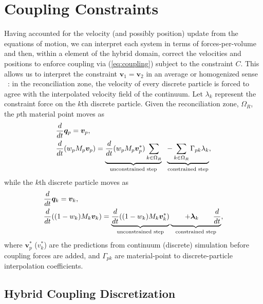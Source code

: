 \section{Coupling Constraints}
Having accounted for the velocity (and possibly position) update from the equations of motion, we can interpret each
system in terms of forces-per-volume and then, within a element of the hybrid domain, correct the velocities and positions to
enforce coupling via (\ref{eq:coupling}) subject to the constraint $C$. This allows us to interpret the constraint
$\bm{v}_1 = \bm{v}_2$ in an average or homogenized sense ~\cite{Bergou:2007:TTDTS}: in the reconciliation zone, 
the velocity of every discrete particle is forced to agree with the interpolated velocity field of the continuum. Let $\lambda_k$
represent the constraint force on the $k$th discrete particle. Given the reconciliation zone, $\Omega_R$, the $p$th
material point moves as
\begin{align}
\begin{aligned}
&\frac{d}{dt} \boldsymbol{q}_p = \bm{v}_p , \\
&\frac{d}{dt} (w_p M_p \bm{v}_p) = \underbrace{\frac{d}{dt} (w_p M_p \bm{v}_p^*) \sum_{k \in \Omega_R} }_{\textrm{\scriptsize unconstrained step}} \hspace{6pt} \underbrace{- \sum_{k \in \Omega_R} \Gamma_{pk}\lambda_k}_{\textrm{\scriptsize constrained step}} ,
\end{aligned}
\end{align}
while the $k$th discrete particle moves as
\begin{align}
\begin{aligned}
&\frac{d}{dt} \boldsymbol{q}_k = \bm{v}_k , \\
&\frac{d}{dt} ((1-w_k) M_k \bm{v}_k) = \underbrace{\frac{d}{dt} ((1-w_k) M_k \bm{v}_k^*)}_{\textrm{\scriptsize unconstrained step}} \underbrace{\hspace{20pt} + \boldsymbol{\lambda}_k  \hspace{20pt} {\frac{d}{dt}}}_{\textrm{\scriptsize constrained step}} ,
\end{aligned}
\end{align}
where $\bm{v}_p^*$ ($v_k^*$) are the predictions from continuum (discrete) simulation before coupling forces are added, and
$\Gamma_{pk}$ are material-point to discrete-particle interpolation coefficients.

\subsection{Hybrid Coupling Discretization} \label{subsec:hybrid_coupling_discretization}

